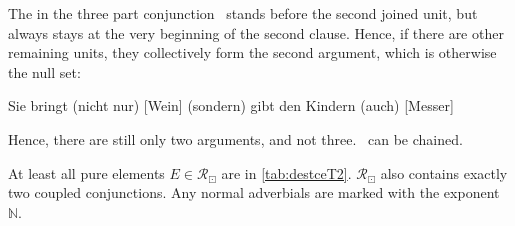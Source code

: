 The  in the three part conjunction \, stands before the second joined unit, but  always stays at the very beginning of the second clause. Hence, if there are other remaining units, they collectively form the second argument, which is otherwise the null set:
\begin{example}
    Sie bringt (nicht nur) [Wein] (sondern) gibt den Kindern (auch) [Messer]
\end{example}
Hence, there are still only two arguments, and not three. \, can be chained. 

At least all pure elements $E\in \mathcal{R}_\boxdot$  are in \autoref{tab:destceT2}. $\mathcal{R}_\boxdot$ also contains exactly two coupled conjunctions. Any normal adverbials  are marked with the exponent $\mathbb{N}$.
